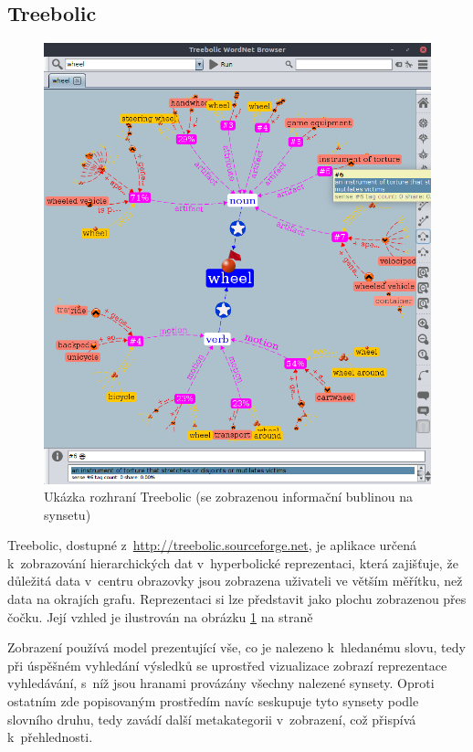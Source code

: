 \documentclass[a4paper,11pt,openany,twoside]{book}
\begin{document}
				\subsection{Treebolic}

					\begin{figure}[h!]
						\centering
						\includegraphics[width=1.0\textwidth]{wntreebolic.png}
						\caption{Ukázka rozhraní Treebolic (se zobrazenou informační bublinou na synsetu)}
						\label{fig:wntreebolic}
					\end{figure}

					Treebolic, dostupné z~\url{http://treebolic.sourceforge.net}, je aplikace určená k~zobrazování hierarchických dat v~hyperbolické reprezentaci, která zajišťuje, že důležitá data v~centru obrazovky jsou zobrazena uživateli ve větším měřítku, než data na okrajích grafu. Reprezentaci si lze představit jako plochu zobrazenou přes čočku. \parencite{boutreebolic} Její vzhled je ilustrován na obrázku \ref{fig:wntreebolic} na straně \pageref{fig:wntreebolic}

					Zobrazení používá model prezentující vše, co je nalezeno k~hledanému slovu, tedy při úspěšném vyhledání výsledků se uprostřed vizualizace zobrazí reprezentace vyhledávání, s~níž jsou hranami provázány všechny nalezené synsety. Oproti ostatním zde popisovaným prostředím navíc seskupuje tyto synsety podle slovního druhu, tedy zavádí další metakategorii v~zobrazení, což přispívá k~přehlednosti. 
\end{document}
